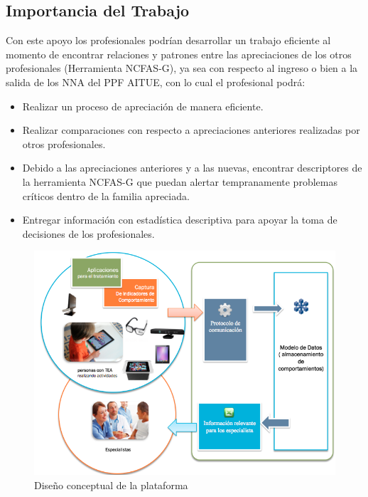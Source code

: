 \documentclass[12pt,letterpaper]{article}
\begin{document}
\subsection{Importancia del Trabajo}
Con este apoyo los profesionales podrían desarrollar un trabajo eficiente al momento de encontrar relaciones y patrones entre las apreciaciones de los otros profesionales (Herramienta NCFAS-G), ya sea con respecto al ingreso o bien a la salida de los NNA del PPF AITUE, con lo cual el profesional podrá:
\begin{itemize}
\item	Realizar un proceso de apreciación de manera eficiente.
\item	Realizar comparaciones con respecto a apreciaciones anteriores realizadas por otros profesionales. 
\item	Debido a las apreciaciones anteriores y a las nuevas, encontrar descriptores de la herramienta NCFAS-G que puedan alertar tempranamente problemas críticos dentro de la familia apreciada. 
\item	Entregar información con estadística descriptiva para apoyar la toma de decisiones de los profesionales.
\end{itemize}

\newpage


\begin{figure}[htb]
\begin{center}
\includegraphics[width=15cm]{mono.png}
\end{center}
\caption{Dise\~no conceptual de la plataforma}
\end{figure}
\end{document}
